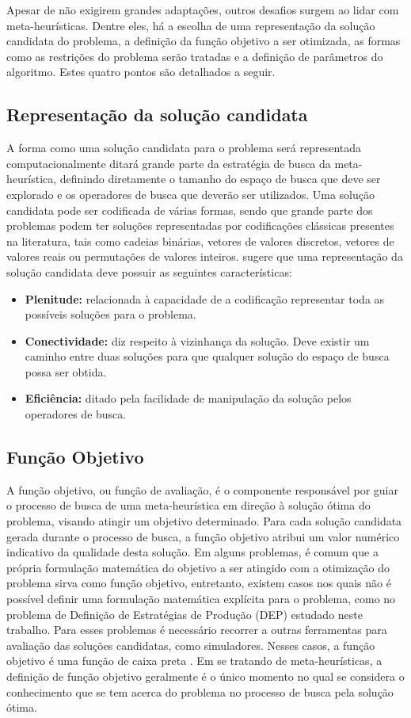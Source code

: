 Apesar de não exigirem grandes adaptações, outros desafios surgem ao lidar com meta-heurísticas. Dentre eles, há a escolha de uma representação da solução candidata do problema, a definição da função objetivo a ser otimizada, as formas como as restrições do problema serão tratadas e a definição de parâmetros do algoritmo. Estes quatro pontos são detalhados a seguir.

\subsection{Representação da solução candidata}
\label{subsec:subc211}
A forma como uma solução candidata para o problema será representada computacionalmente ditará grande parte da estratégia de busca da meta-heurística, definindo diretamente o tamanho do espaço de busca que deve ser explorado e os operadores de busca que deverão ser utilizados. Uma solução candidata pode ser codificada de várias formas, sendo que grande parte dos problemas podem ter soluções representadas por codificações clássicas presentes na literatura, tais como cadeias binárias, vetores de valores discretos, vetores de valores reais ou permutações de valores inteiros. \cite{Talbi2009} sugere que uma representação da solução candidata deve possuir as seguintes características:

\begin{itemize}
\item \textbf{Plenitude:} relacionada à capacidade de a codificação representar toda as possíveis soluções para o problema.
\item \textbf{Conectividade:} diz respeito à vizinhança da solução. Deve existir um caminho entre duas soluções para que qualquer solução do espaço de busca possa ser obtida.
\item \textbf{Eficiência:} ditado pela facilidade de manipulação da solução pelos operadores de busca.
\end{itemize}

\subsection{Função Objetivo}
\label{subsec:subc212}
A função objetivo, ou função de avaliação, é o componente responsável por guiar o processo de busca de uma meta-heurística em direção à solução ótima do problema, visando atingir um objetivo determinado. Para cada solução candidata gerada durante o processo de busca, a função objetivo atribui um valor numérico indicativo da qualidade desta solução. Em alguns problemas, é comum que a própria formulação matemática do objetivo a ser atingido com a otimização do problema sirva como função objetivo, entretanto, existem casos nos quais não é possível definir uma formulação matemática explícita para o problema, como no problema de Definição de Estratégias de Produção (DEP) estudado neste trabalho. Para esses problemas é necessário recorrer a outras ferramentas para avaliação das soluções candidatas, como simuladores. Nesses casos, a função objetivo é uma função de caixa preta \cite{Talbi2009}. Em se tratando de meta-heurísticas, a definição de função objetivo geralmente é o único momento no qual se considera o conhecimento que se tem acerca do problema no processo de busca pela solução ótima.

